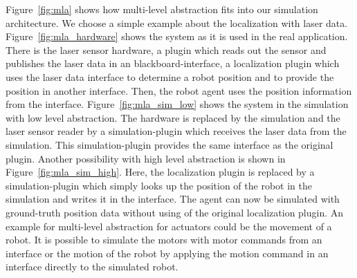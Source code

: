 Figure~\ref{fig:mla} shows how multi-level abstraction fits into our simulation architecture. We choose a simple example about the localization with laser data. Figure~\ref{fig:mla_hardware} shows the system as it is used in the real application. There is the laser sensor hardware, a plugin which reads out the sensor and publishes the laser data in an blackboard-interface, a localization plugin which uses the laser data interface to determine a robot position and to provide the position in another interface. Then, the robot agent uses the position information from the interface. Figure~\ref{fig:mla_sim_low} shows the system in the simulation with low level abstraction. The hardware is replaced by the simulation and the laser sensor reader by a simulation-plugin which receives the laser data from the simulation. This simulation-plugin provides the same interface as the original plugin. Another possibility with high level abstraction is shown in Figure~\ref{fig:mla_sim_high}. Here, the localization plugin is replaced by a simulation-plugin which simply looks up the position of the robot in the simulation and writes it in the interface. The agent can now be simulated with ground-truth position data without using of the original localization plugin. An example for multi-level abstraction for actuators could be the movement of a robot. It is possible to simulate the motors with motor commands from an interface or the motion of the robot by applying the motion command in an interface directly to the simulated robot.
